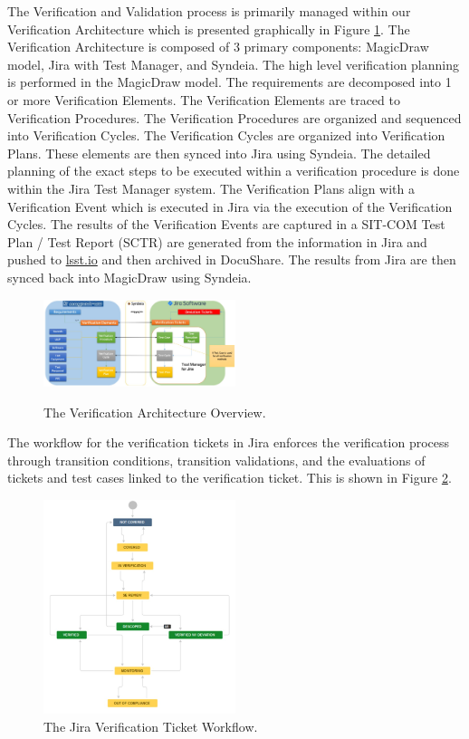 \documentclass[SE,lsstdraft,authoryear,toc]{lsstdoc, lsstdraft}
\begin{document}
The Verification and Validation process is primarily managed within our Verification Architecture which is presented graphically in Figure \ref{fig:verification_arch}.
The Verification Architecture is composed of 3 primary components: MagicDraw model, Jira with Test Manager, and Syndeia.
The high level verification planning is performed in the MagicDraw model.
The requirements are decomposed into 1 or more Verification Elements.
The Verification Elements are traced to Verification Procedures.
The Verification Procedures are organized and sequenced into Verification Cycles.
The Verification Cycles are organized into Verification Plans.
These elements are then synced into Jira using Syndeia.
The detailed planning of the exact steps to be executed within a verification procedure is done within the Jira Test Manager system.
The Verification Plans align with a Verification Event which is executed in Jira via the execution of the Verification Cycles.
The results of the Verification Events are captured in a SIT-COM Test Plan / Test Report (SCTR) are generated from the information in Jira and pushed to \href{https://lsst.io}{lsst.io} and then archived in DocuShare.
The results from Jira are then synced back into MagicDraw using Syndeia.

\begin{figure}[h]
    \centering
    \includegraphics[width=0.5\textwidth]{static/verification_architecture}
    \label{fig:verification_arch}
    \caption{The Verification Architecture Overview.}
\end{figure}

The workflow for the verification tickets in Jira enforces the verification process through transition conditions, transition validations, and the evaluations of tickets and test cases linked to the verification ticket.
This is shown in Figure \ref{fig:verification_workflow}.

\begin{figure}[h]
    \centering
    \includegraphics[width=0.5\textwidth]{static/verification_workflow}
    \caption{The Jira Verification Ticket Workflow.}
    \label{fig:verification_workflow}
\end{figure}
\end{document}
